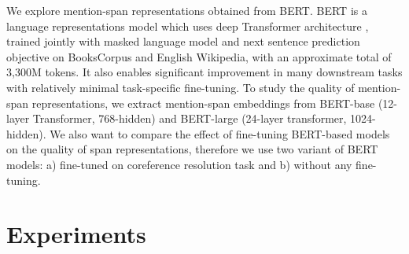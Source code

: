 \documentclass[11pt]{article}
\begin{document}
We explore mention-span representations obtained from BERT. BERT \parencite{devlin2019bert} is a language representations model which uses deep Transformer architecture \parencite{transformers}, trained jointly with masked language model and next sentence prediction objective on BooksCorpus \parencite{bookscorpus} and English Wikipedia, with an approximate total of 3,300M tokens. It also enables significant improvement in many downstream tasks with relatively minimal task-specific fine-tuning. To study the quality of mention-span representations, we extract mention-span embeddings from BERT-base (12-layer Transformer, 768-hidden) and BERT-large (24-layer transformer, 1024-hidden). We also want to compare the effect of fine-tuning BERT-based models on the quality of span representations, therefore we use two variant of BERT models: a) fine-tuned on coreference resolution task and b) without any fine-tuning.



\section{Experiments}


\end{document}
